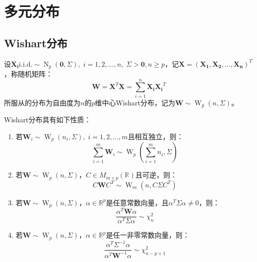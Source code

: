 \section{多元分布}

\subsection{Wishart分布}
\begin{definition}
	设$\mathbf{X_i}\text{i.i.d.}\sim\operatorname{N}_p(\mathbf{0},\Sigma),\;i=1,2,\dots,n,\;\Sigma>\mathbf{0},n\geqslant p$，记$\mathbf{X}=(\mathbf{X_1},\mathbf{X_2},\dots,\mathbf{X_n})^T$，称随机矩阵：
	\begin{equation*}
		\mathbf{W}=\mathbf{X}^T\mathbf{X}=\sum_{i=1}^{n}\mathbf{X_i}\mathbf{X_i}^T
	\end{equation*}
	所服从的分布为自由度为$n$的$p$维中心Wishart分布，记为$\mathbf{W}\sim\operatorname{W}_p(n,\Sigma)$。
\end{definition}
\begin{property}\label{prop:Wishart}
	Wishart分布具有如下性质：
	\begin{enumerate}
		\item 若$\mathbf{W}_i\sim\operatorname{W}_p(n_i,\Sigma),\;i=1,2,\dots,m$且相互独立，则：
		\begin{equation*}
			\sum_{i=1}^{m}\mathbf{W}_i\sim\operatorname{W}_p\left(\sum_{i=1}^{m}n_i,\Sigma\right)
		\end{equation*}
		\item 若$\mathbf{W}\sim\operatorname{W}_p(n,\Sigma)$，$C\in M_{m\times p}(\mathbb{R}^{})$且可逆，则：
		\begin{equation*}
			C\mathbf{W}C^T\sim\operatorname{W}_m(n, C\Sigma C^T)
		\end{equation*}
		\item 若$\mathbf{W}\sim\operatorname{W}_p(n,\Sigma)$，$\alpha\in\mathbb{R}^{p}$是任意常数向量，且$\alpha^T\Sigma\alpha\ne0$，则：
		\begin{equation*}
			\frac{\alpha^T\mathbf{W}\alpha}{\alpha^T\Sigma\alpha}\sim\chi_n^2
		\end{equation*}
		\item 若$\mathbf{W}\sim\operatorname{W}_p(n,\Sigma)$，$\alpha\in\mathbb{R}^{p}$是任一非零常数向量，则：
		\begin{equation*}
			\frac{\alpha^T\Sigma^{-1}\alpha}{\alpha^T\mathbf{W}^{-1}\alpha}\sim\chi_{n-p+1}^2
		\end{equation*}
	\end{enumerate}
\end{property}
